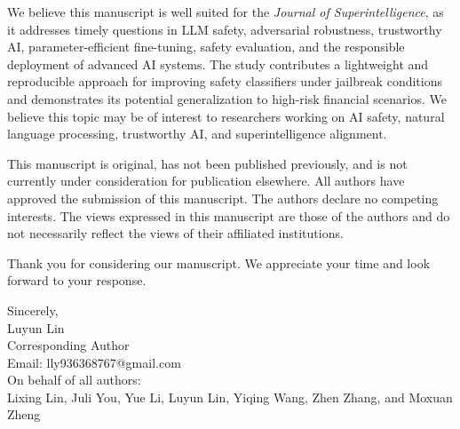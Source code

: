 \documentclass[12pt]{article}
\begin{document}
We believe this manuscript is well suited for the \textit{Journal of Superintelligence}, as it addresses timely questions in LLM safety, adversarial robustness, trustworthy AI, parameter-efficient fine-tuning, safety evaluation, and the responsible deployment of advanced AI systems. The study contributes a lightweight and reproducible approach for improving safety classifiers under jailbreak conditions and demonstrates its potential generalization to high-risk financial scenarios. We believe this topic may be of interest to researchers working on AI safety, natural language processing, trustworthy AI, and superintelligence alignment.

This manuscript is original, has not been published previously, and is not currently under consideration for publication elsewhere. All authors have approved the submission of this manuscript. The authors declare no competing interests. The views expressed in this manuscript are those of the authors and do not necessarily reflect the views of their affiliated institutions.

Thank you for considering our manuscript. We appreciate your time and look forward to your response.


Sincerely,\\
Luyun Lin\\
Corresponding Author\\
Email: lly936368767@gmail.com\\[1em]

On behalf of all authors:\\
Lixing Lin, Juli You, Yue Li, Luyun Lin, Yiqing Wang, Zhen Zhang, and Moxuan Zheng
\end{document}
